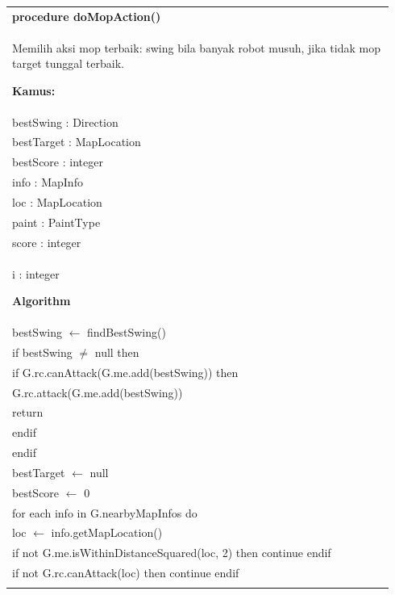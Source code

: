 \documentclass{article}
\newenvironment{pseudobox}
{
\centering
\begin{longtable}{|p{0.94\linewidth}|}
\hline
}
{
\\ \hline
\end{longtable}
\vspace{0.05cm}
}
\begin{document}
\begin{pseudobox}
\textbf{procedure doMopAction()} \\
{ Memilih aksi mop terbaik: swing bila banyak robot musuh, jika tidak mop target tunggal terbaik. }

\textbf{Kamus:} \\
\hspace*{1em} bestSwing : Direction \\
\hspace*{1em} bestTarget : MapLocation \\
\hspace*{1em} bestScore : integer \\
\hspace*{1em} info : MapInfo \\
\hspace*{1em} loc : MapLocation \\
\hspace*{1em} paint : PaintType \\
\hspace*{1em} score : integer \\
\hspace*{1em} i : integer

\textbf{Algorithm} \\
\hspace*{1em} bestSwing $\leftarrow$ findBestSwing() \\

\hspace*{1em} if bestSwing $\neq$ null then \\
\hspace*{2em} if G.rc.canAttack(G.me.add(bestSwing)) then \\
\hspace*{3em} G.rc.attack(G.me.add(bestSwing)) \\
\hspace*{3em} return \\
\hspace*{2em} endif \\
\hspace*{1em} endif \\

\hspace*{1em} bestTarget $\leftarrow$ null \\
\hspace*{1em} bestScore $\leftarrow$ 0 \\

\hspace*{1em} for each info in G.nearbyMapInfos do \\
\hspace*{2em} loc $\leftarrow$ info.getMapLocation() \\
\hspace*{2em} if not G.me.isWithinDistanceSquared(loc, 2) then continue endif \\
\hspace*{2em} if not G.rc.canAttack(loc) then continue endif \\


\end{pseudobox}
\end{document}
